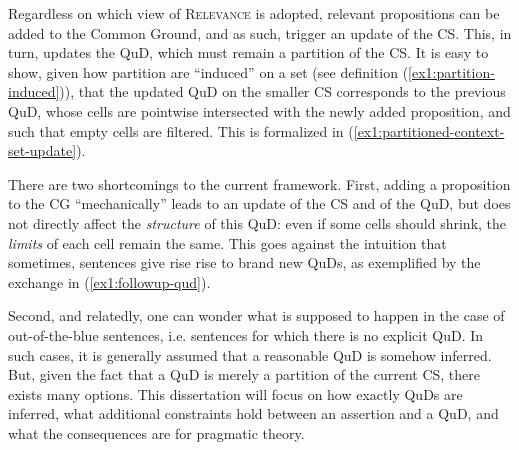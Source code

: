 Regardless on which view of \textsc{Relevance} is adopted, relevant propositions can be added to the Common Ground, and as such, trigger an update of the CS. This, in turn, updates the QuD, which must remain a partition of the CS. It is easy to show, given how partition are ``induced'' on a set (see definition (\ref{ex1:partition-induced})), that the updated QuD on the smaller CS corresponds to the previous QuD, whose cells are pointwise intersected with the newly added proposition, and such that empty cells are filtered. This is formalized in (\ref{ex1:partitioned-context-set-update}).

\begin{exe}
	\label{ex1:partitioned-context-set-update}
\end{exe}

There are two shortcomings to the current framework. First, adding a proposition to  the CG ``mechanically'' leads to an update of the CS and of the QuD, but does not directly affect the \textit{structure} of this QuD: even if some cells should shrink, the \textit{limits} of each cell remain the same. This goes against the intuition that sometimes, sentences give rise rise to brand new QuDs, as exemplified by the exchange in (\ref{ex1:followup-qud}).

\begin{exe}
	\label{ex1:followup-qud}
\end{exe}


Second, and relatedly, one can wonder what is supposed to happen in the case of out-of-the-blue sentences, i.e. sentences for which there is no explicit QuD. In such cases, it is generally assumed that a reasonable QuD is somehow inferred. But, given the fact that a QuD is merely a partition of the current CS, there exists many options. This dissertation will focus on how exactly QuDs are inferred, what additional constraints hold between an assertion and a QuD, and what the consequences are for pragmatic theory.

